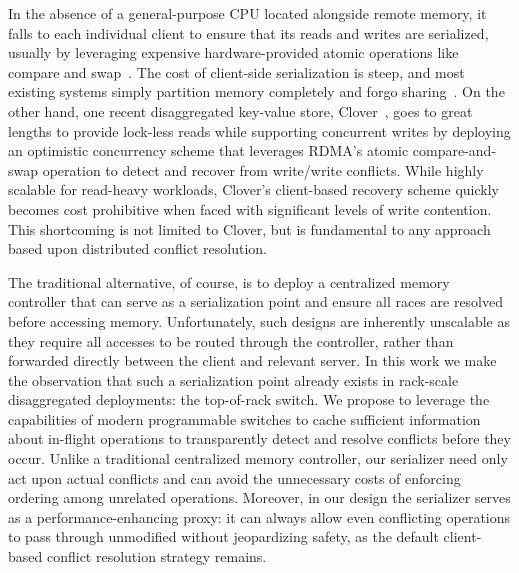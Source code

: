 

In the absence of a general-purpose CPU located alongside remote
memory, it falls to each individual client to ensure that its reads
and writes are serialized, usually by leveraging expensive
hardware-provided atomic operations like compare and
swap~\cite{design-guidelines,clover}.  The cost of client-side
serialization is steep, and most existing systems simply partition memory
completely and forgo sharing~\cite{reigons,fastswap, legoos}.  On the
other hand, one recent disaggregated key-value store,
Clover~\cite{clover}, goes to great lengths to provide lock-less reads
while supporting concurrent writes by deploying an optimistic
concurrency scheme that leverages RDMA's atomic compare-and-swap
operation to detect and recover from write/write conflicts.  While
highly scalable for read-heavy workloads, Clover's client-based
recovery scheme quickly becomes cost prohibitive when faced with
significant levels of write contention.  This shortcoming is not
limited to Clover, but is fundamental to any approach based upon
distributed conflict resolution.


The traditional alternative, of course, is to deploy a centralized
memory controller that can serve as a serialization point and ensure
all races are resolved before accessing memory.  Unfortunately, such
designs are inherently unscalable as they require all accesses to be
routed through the controller, rather than forwarded directly between
the client and relevant server.  In this work we make the observation
that such a serialization point already exists in rack-scale
disaggregated deployments: the top-of-rack switch.  We propose to
leverage the capabilities of modern programmable switches to cache
sufficient information about in-flight operations to transparently
detect and resolve conflicts before they occur.  Unlike a traditional
centralized memory controller, our serializer need only act upon
actual conflicts and can avoid the unnecessary costs of enforcing
ordering among unrelated operations.  Moreover, in our design the
serializer serves as a performance-enhancing proxy: it can always
allow even conflicting operations to pass through unmodified without
jeopardizing safety, as the default client-based conflict resolution
strategy remains.

